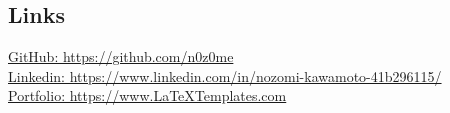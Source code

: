 \documentclass[10pt]{article} %
\begin{document}
\begin{paracol}{2}
\section{Links}
{\faGithub} \hspace{1mm} \href{https://github.com/n0z0me}{GitHub: https://github.com/n0z0me} \\ %
{\faLinkedinSquare} \hspace{1mm} \href{https://www.linkedin.com/in/nozomi-kawamoto-41b296115/}{Linkedin: https://www.linkedin.com/in/nozomi-kawamoto-41b296115/} \\ %
{\small\faDesktop} \hspace{1mm} \href{https://www.LaTeXTemplates.com}{Portfolio: https://www.LaTeXTemplates.com} \\ %

\end{paracol}

\end{document}
